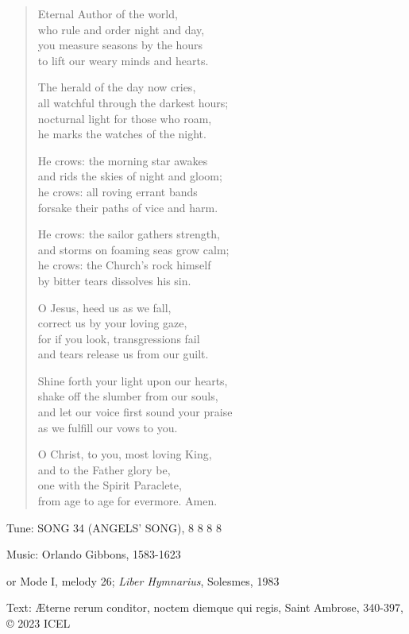 \hymn

\begin{verse}
Eternal Author of the world,\\
who rule and order night and day,\\
you measure seasons by the hours\\
to lift our weary minds and hearts.

The herald of the day now cries,\\
all watchful through the darkest hours;\\
nocturnal light for those who roam,\\
he marks the watches of the night.

He crows: the morning star awakes\\
and rids the skies of night and gloom;\\
he crows: all roving errant bands\\
forsake their paths of vice and harm.

He crows: the sailor gathers strength,\\
and storms on foaming seas grow calm;\\
he crows: the Church’s rock himself\\
by bitter tears dissolves his sin.

O Jesus, heed us as we fall,\\
correct us by your loving gaze,\\
for if you look, transgressions fail\\
and tears release us from our guilt.

Shine forth your light upon our hearts,\\
shake off the slumber from our souls,\\
and let our voice first sound your praise\\
as we fulfill our vows to you.

O Christ, to you, most loving King,\\
and to the Father glory be,\\
one with the Spirit Paraclete,\\
from age to age for evermore. Amen.
\end{verse}

\begin{hymnsource}
Tune: SONG 34 (ANGELS’ SONG), 8 8 8 8

Music: Orlando Gibbons, 1583-1623

or Mode I, melody 26; \emph{Liber Hymnarius}, Solesmes, 1983

Text: Æterne rerum conditor, noctem diemque qui regis, Saint Ambrose, 340-397, © 2023 ICEL
\end{hymnsource}
